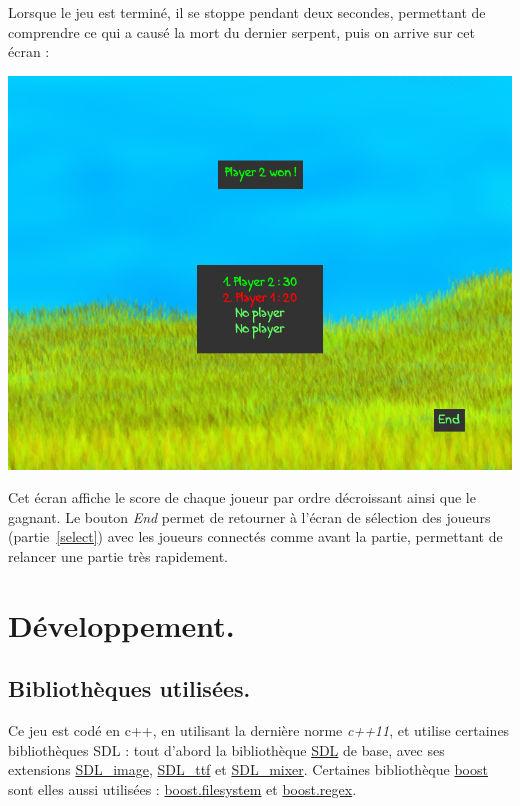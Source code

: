 \documentclass{article}
\begin{document}
Lorsque le jeu est terminé, il se stoppe pendant deux secondes, permettant de comprendre ce qui a causé la mort du dernier serpent, puis on arrive sur cet écran :
\begin{center}
	\includegraphics[scale=0.4]{img/game_over.png}
\end{center}
Cet écran affiche le score de chaque joueur par ordre décroissant ainsi que le gagnant. Le bouton \emph{End} permet de retourner à l'écran de sélection des joueurs (partie~\ref{select}) avec les joueurs connectés comme avant la partie, permettant de relancer une partie très rapidement.

\section{Développement.}
\subsection{Bibliothèques utilisées.}
Ce jeu est codé en c++, en utilisant la dernière norme \emph{c++11}, et utilise certaines bibliothèques SDL : tout d'abord la bibliothèque \href{http://www.libsdl.org/}{SDL} de base, avec ses extensions \href{http://www.libsdl.org/projects/SDL\_image/}{SDL\_image}, \href{http://www.libsdl.org/projects/SDL\_ttf/}{SDL\_ttf} et \href{http://www.libsdl.org/projects/SDL\_mixer/}{SDL\_mixer}. Certaines bibliothèque \href{http://www.boost.org/}{boost} sont elles aussi utilisées : \href{http://www.boost.org/doc/libs/1\_39\_0/libs/filesystem/doc/index.htm}{boost.filesystem} et \href{http://www.boost.org/doc/libs/1\_53\_0/libs/regex/doc/html/index.html}{boost.regex}.
\end{document}

